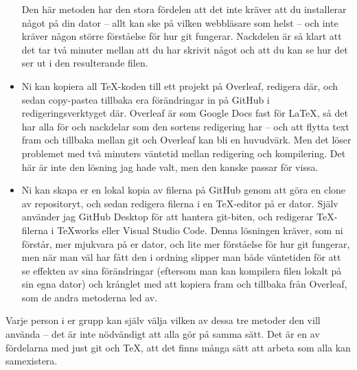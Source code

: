 \documentclass{tufte-handout}
\begin{document}
\begin{itemize}
	Den här metoden har den stora fördelen att det inte kräver att du installerar något på din dator -- allt kan ske på vilken webbläsare som helst -- och inte kräver någon större förståelse för hur git fungerar. Nackdelen är så klart att det tar två minuter mellan att du har skrivit något och att du kan se hur det ser ut i den resulterande filen.
	\item Ni kan kopiera all TeX-koden till ett projekt på Overleaf, redigera där, och sedan copy-pastea tillbaka era förändringar in på GitHub i redigeringsverktyget där. Overleaf är som Google Docs fast för \LaTeX, så det har alla för och nackdelar som den sortens redigering har -- och att flytta text fram och tillbaka mellan git och Overleaf kan bli en huvudvärk. Men det löser problemet med två minuters väntetid mellan redigering och kompilering. Det här är inte den lösning jag hade valt, men den kanske passar för vissa.
	\item Ni kan skapa er en lokal kopia av filerna på GitHub genom att göra en clone av repositoryt, och sedan redigera filerna i en TeX-editor på er dator. Själv använder jag GitHub Desktop för att hantera git-biten, och redigerar TeX-filerna i TeXworks eller Visual Studio Code. Denna lösningen kräver, som ni förstår, mer mjukvara på er dator, och lite mer förståelse för hur git fungerar, men när man väl har fått den i ordning slipper man både väntetiden för att se effekten av sina förändringar (eftersom man kan kompilera filen lokalt på sin egna dator) och krånglet med att kopiera fram och tillbaka från Overleaf, som de andra metoderna led av.
\end{itemize}

Varje person i er grupp kan själv välja vilken av dessa tre metoder den vill använda -- det är inte nödvändigt att alla gör på samma sätt. Det är en av fördelarna med just git och TeX, att det finns många sätt att arbeta som alla kan samexistera.
\end{document}

